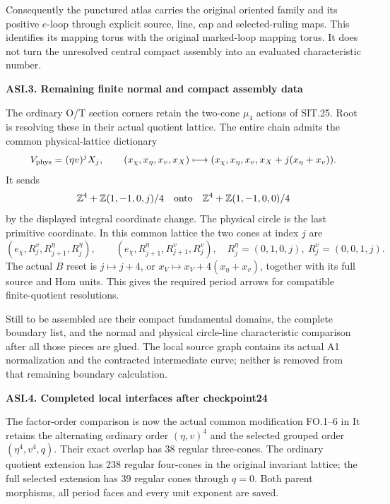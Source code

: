 Consequently the punctured atlas carries the original oriented
family and its positive \(e\)-loop through explicit source,
line, cap and selected-ruling maps. This identifies its mapping
torus with the original marked-loop mapping torus. It does not
turn the unresolved central compact assembly into an evaluated
characteristic number.

\par

\medskip\noindent\textbf{ASI.3. Remaining finite normal and compact assembly data}

\par\nobreak

The ordinary O/T section corners retain the two-cone
\(\mu_4\) actions of SIT.25. Root is resolving these in their
actual quotient lattice. The entire chain admits the common
physical-lattice dictionary
\[
 V_{\rm phys}=(\eta v)^jX_j,\qquad
 (x_\chi,x_\eta,x_v,x_X)\longmapsto
 (x_\chi,x_\eta,x_v,x_X+j(x_\eta+x_v)).
\]
It sends
\[
 \mathbb Z^4+\mathbb Z(1,-1,0,j)/4
 \quad\hbox{onto}\quad
 \mathbb Z^4+\mathbb Z(1,-1,0,0)/4
\]
by the displayed integral coordinate change. The physical
circle is the last primitive coordinate. In this common
lattice the two cones at index \(j\) are
\[
 (e_\chi,R^v_j,R^\eta_{j+1},R^\eta_j),\qquad
 (e_\chi,R^\eta_{j+1},R^v_{j+1},R^v_j),
\quad
 R^\eta_j=(0,1,0,j),\ R^v_j=(0,0,1,j).
\]
The actual \(B\) reset is \(j\mapsto j+4\), or
\(x_V\mapsto x_V+4(x_\eta+x_v)\), together with its full
source and Hom units. This gives the required period arrows
for compatible finite-quotient resolutions.

Still to be assembled are their compact fundamental domains,
the complete boundary list, and the normal and physical
circle-line characteristic comparison after all those pieces
are glued. The local source graph contains its actual A1
normalization and the contracted intermediate curve; neither
is removed from that remaining boundary calculation.

\par

\medskip\noindent\textbf{ASI.4. Completed local interfaces after checkpoint24}

\par\nobreak

The factor-order comparison is now the actual common
modification FO.1--6 in
It retains the alternating ordinary order \((\eta,v)^4\)
and the selected grouped order \((\eta^4,v^4,q)\).
Their exact overlap has 38 regular three-cones.
The ordinary quotient extension has 238 regular
four-cones in the original invariant lattice; the
full selected extension has 39 regular cones through
\(q=0\). Both parent morphisms, all period faces
and every unit exponent are saved.

